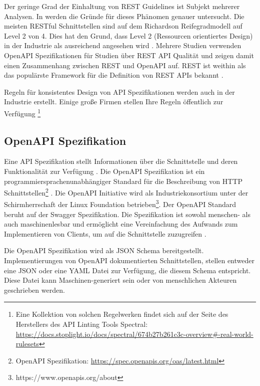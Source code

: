 Der geringe Grad der Einhaltung von REST Guidelines ist Subjekt mehrerer Analysen. In \parencite{kotstein_which_2021} werden die Gründe für dieses Phänomen genauer untersucht. Die meisten \acs{REST}ful Schnittstellen sind auf dem Richardson Reifegradmodell auf Level 2 von 4. Dies hat den Grund, dass Level 2 (Ressourcen orientiertes Design) in der Industrie als ausreichend angesehen wird \parencite{kotstein_which_2021}. Mehrere Studien verwenden OpenAPI Spezifikationen für Studien über \acs{REST} \acs{API} Qualität \parencite{eriksson_using_2023}\parencite{bogner_restruler_2024} und zeigen damit einen Zusammenhang zwischen \acs{REST} und OpenAPI auf. \acs{REST} ist weithin als das populärste Framework für die Definition von \acs{REST} \acs{API}s bekannt \parencite{openapi_initiative_openapi_2024}.

Regeln für konsistentes Design von \acs{API} Spezifikationen werden auch in der Industrie erstellt. Einige große Firmen stellen Ihre Regeln öffentlich zur Verfügung \footnote{Eine Kollektion von solchen Regelwerken findet sich auf der Seite des Herstellers des API Linting Tools Spectral: \href{https://docs.stoplight.io/docs/spectral/674b27b261c3c-overview\#-real-world-rulesets}{https://docs.stoplight.io/docs/spectral/674b27b261c3c-overview\#-real-world-rulesets}} \parencite{stoplight_spectral_2024-2}


\subsection{OpenAPI Spezifikation} \label{sec: openapisepzifikation}
Eine API Spezifikation stellt Informationen über die Schnittstelle und deren Funktionalität zur Verfügung \parencite{sommerville_software_2018}. Die OpenAPI Spezifikation ist ein programmiersprachenunabhängiger Standard für die Beschreibung von \acs{HTTP} Schnittstellen\footnote{OpenAPI Spezifikation: \href{https://spec.openapis.org/oas/latest.html}{https://spec.openapis.org/oas/latest.html}} \parencite{noauthor_openapi_2024}. Die OpenAPI Initiative wird als Industriekonsortium unter der Schirmherrschaft der Linux Foundation betrieben\footnote{https://www.openapis.org/about}. Der OpenAPI Standard beruht auf der Swagger Spezifikation. Die Spezifikation ist sowohl menschen- als auch maschinenlesbar und ermöglicht eine Vereinfachung des Aufwands zum Implementieren von Clients, um auf die Schnittstelle zuzugreifen \parencite{eriksson_using_2023}. 

Die OpenAPI Spezifikation wird als \acf{JSON} Schema bereitgestellt. Implementierungen von OpenAPI dokumentierten Schnittstellen, stellen entweder eine \acs{JSON} oder eine \acf{YAML} Datei zur Verfügung, die diesem Schema entspricht. Diese Datei kann Maschinen-generiert sein oder von menschlichen Akteuren geschrieben werden. 

